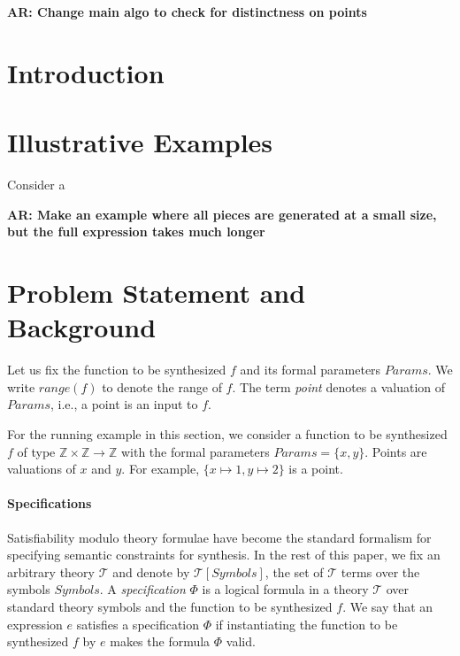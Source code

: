 \documentclass{llncs}
\newcommand\arsays[1]{{\bf AR: #1}}
\newcommand\Integers{\mathbb{Z}}
\newcommand\Expr{e}
\newcommand\Spec{\Phi}
\newcommand\SynthFun{f}
\newcommand\range{\mathit{range}}
\newcommand\FormalParameters{\mathit{Params}}
\newcommand\Symbols{\mathit{Symbols}}
\newcommand\Theory{\mathcal{T}}
\begin{document}
\arsays{Change main algo to check for distinctness on points}

\section{Introduction}
\label{sec:intro}

\section{Illustrative Examples}
\label{sec:example}

Consider a 

\arsays{Make an example where all pieces are generated at a small size,
but the full expression takes much longer}


\section{Problem Statement and Background}
\label{sec:problem}

Let us fix the function to be synthesized $\SynthFun$ and its formal
parameters $\FormalParameters$.
We write $\range(\SynthFun)$ to denote the range of $\SynthFun$.
The term {\em point} denotes a valuation of $\FormalParameters$, i.e., a
point is an input to $\SynthFun$.

\begin{example}
  For the running example in this section, we consider a function to be
  synthesized $\SynthFun$ of type $\Integers \times \Integers \to
  \Integers$ with the formal parameters $\FormalParameters = \{ x, y \}$.
  Points are valuations of $x$ and $y$. 
  For example, $\{ x \mapsto 1, y \mapsto 2 \}$ is a point.
\end{example}

\paragraph{Specifications}
Satisfiability modulo theory formulae have become the standard formalism
for specifying semantic constraints for synthesis.
In the rest of this paper, we fix an arbitrary theory $\Theory$ and 
denote by $\Theory[\Symbols]$, the set of $\Theory$ terms over the
symbols $\Symbols$.
A {\em specification} $\Spec$ is a logical formula in a theory $\Theory$
over standard theory symbols and the function to be synthesized
$\SynthFun$.
We say that an expression $\Expr$ satisfies a specification $\Spec$ if
instantiating the function to be synthesized $\SynthFun$ by $\Expr$
makes the formula $\Spec$ valid.
\end{document}
